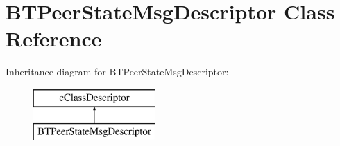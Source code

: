 \hypertarget{classBTPeerStateMsgDescriptor}{}\section{B\+T\+Peer\+State\+Msg\+Descriptor Class Reference}
\label{classBTPeerStateMsgDescriptor}
Inheritance diagram for B\+T\+Peer\+State\+Msg\+Descriptor\+:\begin{figure}[H]
\begin{center}
\leavevmode
\includegraphics[height=2.000000cm]{classBTPeerStateMsgDescriptor}
\end{center}
\end{figure}
